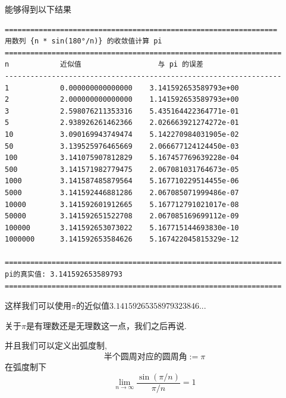 能够得到以下结果
\begin{verbatim}
================================================================
用数列 {n * sin(180°/n)} 的收敛值计算 pi
=================================================================
n            近似值                  与 pi 的误差             
-----------------------------------------------------------------
1            0.000000000000000    3.141592653589793e+00
2            2.000000000000000    1.141592653589793e+00
3            2.598076211353316    5.435164422364771e-01
5            2.938926261462366    2.026663921274272e-01
10           3.090169943749474    5.142270984031905e-02
50           3.139525976465669    2.066677124124450e-03
100          3.141075907812829    5.167457769639228e-04
500          3.141571982779475    2.067081031764673e-05
1000         3.141587485879564    5.167710229514455e-06
5000         3.141592446881286    2.067085071999486e-07
10000        3.141592601912665    5.167712791021017e-08
50000        3.141592651522708    2.067085169699112e-09
100000       3.141592653073022    5.167715144693830e-10
1000000      3.141592653584626    5.167422045815329e-12

=================================================================
pi的真实值: 3.141592653589793
=================================================================	
\end{verbatim}
这样我们可以使用$\pi$的近似值$3.14159265358979323846...$

关于$\pi$是有理数还是无理数这一点，我们之后再说.

并且我们可以定义出弧度制,
$$\text{半个圆周对应的圆周角}:=\pi$$
在弧度制下$$\lim\limits_{n\to\infty}\frac{\sin(\pi/n)}{\pi/n}=1$$


